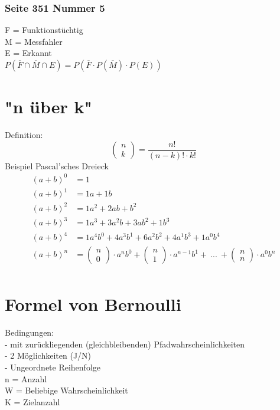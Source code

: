\documentclass[a4paper,12pt]{article}
\begin{document}
\subsubsection*{Seite 351 Nummer 5}
F = Funktionstüchtig\\
M = Messfahler\\
E = Erkannt\\
$P(\overline{F} \cap \overline{M} \cap E) = P(\overline{F} \cdot P(\overline{M}) \cdot P(E))$
\pagebreak
\section*{"n über k"}
Definition:
$$\begin{pmatrix}n\\k\end{pmatrix} = \frac{n!}{(n - k)! \cdot k!}$$
Beispiel Pascal'sches Dreieck
\begin{equation}
\begin{split}
(a + b)^0 & = 1\\
(a + b)^1 & = 1a + 1b\\
(a + b)^2 & = 1a^2 + 2ab + b^2\\
(a + b)^3 & = 1a^3 + 3a^2b + 3ab^2 + 1b^3\\
(a + b)^4 & = 1a^4b^0 + 4a^3b^1 + 6a^2b^2 + 4a^1b^3 + 1a^0b^4\\
(a + b)^n & = \begin{pmatrix}n\\0\end{pmatrix} \cdot a^nb^0 + \begin{pmatrix}n\\1\end{pmatrix} \cdot a^{n-1}b^1 +\ ...\ + \begin{pmatrix}n\\n\end{pmatrix} \cdot a^0b^n\\
\end{split}
\end{equation}
\section*{Formel von Bernoulli}
\large{Bedingungen:}\\
- mit zurückliegenden (gleichbleibenden) Pfadwahrscheinlichkeiten\\
- 2 Möglichkeiten (J/N)\\
- Ungeordnete Reihenfolge\\
n = Anzahl\\
W = Beliebige Wahrscheinlichkeit\\
K = Zielanzahl\\ 
\end{document}
